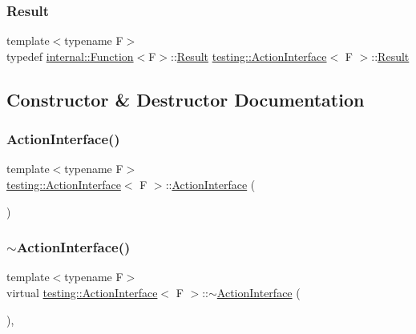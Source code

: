 \subsubsection{\texorpdfstring{Result}{Result}}
{\footnotesize\ttfamily template$<$typename F$>$ \\
typedef \hyperlink{structtesting_1_1internal_1_1_function}{internal\+::\+Function}$<$F$>$\+::\hyperlink{classtesting_1_1_action_interface_a7477de2fe3e4e01c59db698203acaee7}{Result} \hyperlink{classtesting_1_1_action_interface}{testing\+::\+Action\+Interface}$<$ F $>$\+::\hyperlink{classtesting_1_1_action_interface_a7477de2fe3e4e01c59db698203acaee7}{Result}}



\subsection{Constructor \& Destructor Documentation}
\mbox{\label{classtesting_1_1_action_interface_a0f1d44e4c669a9cae5ee5b28419a6f52}} 
\subsubsection{\texorpdfstring{Action\+Interface()}{ActionInterface()}}
{\footnotesize\ttfamily template$<$typename F$>$ \\
\hyperlink{classtesting_1_1_action_interface}{testing\+::\+Action\+Interface}$<$ F $>$\+::\hyperlink{classtesting_1_1_action_interface}{Action\+Interface} (\begin{DoxyParamCaption}{ }\end{DoxyParamCaption})\hspace{0.3cm}{\ttfamily [inline]}}

\mbox{\label{classtesting_1_1_action_interface_a7dd0a5fc93d86ae3c9d04963b9f3a93f}} 
\subsubsection{\texorpdfstring{$\sim$\+Action\+Interface()}{~ActionInterface()}}
{\footnotesize\ttfamily template$<$typename F$>$ \\
virtual \hyperlink{classtesting_1_1_action_interface}{testing\+::\+Action\+Interface}$<$ F $>$\+::$\sim$\hyperlink{classtesting_1_1_action_interface}{Action\+Interface} (\begin{DoxyParamCaption}{ }\end{DoxyParamCaption})\hspace{0.3cm}{\ttfamily [inline]}, {\ttfamily [virtual]}}



